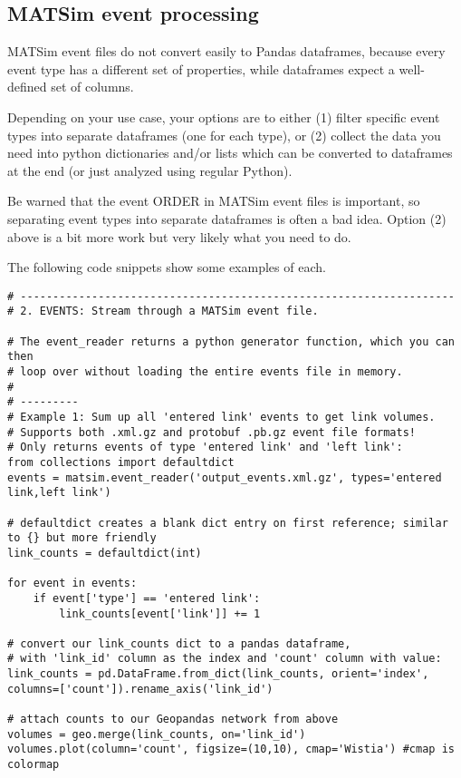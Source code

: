 \subsection{MATSim event processing}

MATSim event files do not convert easily to Pandas dataframes, because every event type has a different set of properties, while dataframes expect a well-defined set of columns.

Depending on your use case, your options are to either (1) filter specific event types into separate dataframes (one for each type), or (2) collect the data you need into python dictionaries and/or lists which can be converted to dataframes at the end (or just analyzed using regular Python).

Be warned that the event ORDER in MATSim event files is important, so separating event types into separate dataframes is often a bad idea. Option (2) above is a bit more work but very likely what you need to do.

The following code snippets show some examples of each.

\begin{lstlisting}
# -------------------------------------------------------------------
# 2. EVENTS: Stream through a MATSim event file.

# The event_reader returns a python generator function, which you can then
# loop over without loading the entire events file in memory.
#
# ---------
# Example 1: Sum up all 'entered link' events to get link volumes.
# Supports both .xml.gz and protobuf .pb.gz event file formats!
# Only returns events of type 'entered link' and 'left link':
from collections import defaultdict
events = matsim.event_reader('output_events.xml.gz', types='entered link,left link')

# defaultdict creates a blank dict entry on first reference; similar to {} but more friendly
link_counts = defaultdict(int)

for event in events:
    if event['type'] == 'entered link':
        link_counts[event['link']] += 1

# convert our link_counts dict to a pandas dataframe,
# with 'link_id' column as the index and 'count' column with value:
link_counts = pd.DataFrame.from_dict(link_counts, orient='index', columns=['count']).rename_axis('link_id')

# attach counts to our Geopandas network from above
volumes = geo.merge(link_counts, on='link_id')
volumes.plot(column='count', figsize=(10,10), cmap='Wistia') #cmap is colormap
\end{lstlisting}


